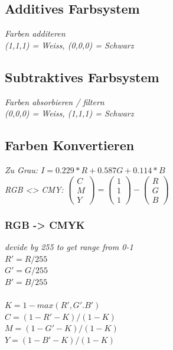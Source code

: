 \subsection{Additives Farbsystem}

\textit{Farben additeren} \\
\textit{(1,1,1) = Weiss, (0,0,0) = Schwarz}

\subsection{Subtraktives Farbsystem}

\textit{Farben absorbieren / filtern} \\ 
\textit{(0,0,0) = Weiss, (1,1,1) = Schwarz}

\subsection{Farben Konvertieren}

\textit{Zu Grau: $I = 0.229*R+0.587G+0.114*B$} \\

\textit{RGB <> CMY: }
$\begin{pmatrix} C \\ M \\ Y \end{pmatrix} =
\begin{pmatrix} 1 \\ 1 \\ 1 \end{pmatrix} -
\begin{pmatrix} R \\ G \\ B \end{pmatrix}$ \\

\subsubsection{RGB -> CMYK}
\textit{devide by 255 to get range from 0-1}\\
$R' = R / 255$\\
$G' = G / 255$\\
$B' = B / 255$\\
\\
$K = 1-max(R',G'.B')$\\
$C = (1-R'-K) / (1-K)$\\
$M = (1-G'-K) / (1-K)$\\
$Y = (1-B'-K) / (1-K)$\\

